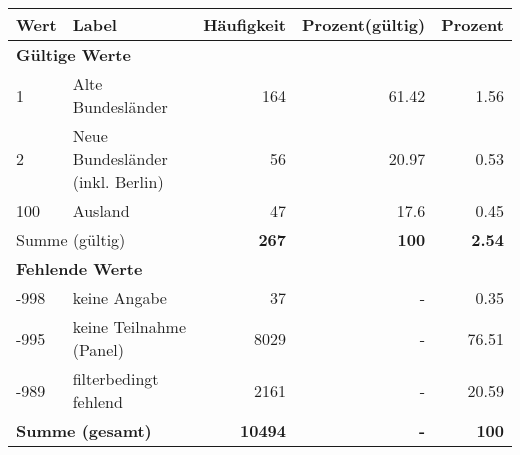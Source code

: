      \begin{longtable}{lXrrr}
     \toprule
     \textbf{Wert} & \textbf{Label} & \textbf{Häufigkeit} & \textbf{Prozent(gültig)} & \textbf{Prozent} \\
     \endhead
     \midrule
     \multicolumn{5}{l}{\textbf{Gültige Werte}}\\

     1 &
     \multicolumn{1}{X}{ Alte Bundesländer   } &


       \num{164} &
       \num[round-mode=places,round-precision=2]{61.42} &
         \num[round-mode=places,round-precision=2]{1.56} \\

     2 &
     \multicolumn{1}{X}{ Neue Bundesländer (inkl. Berlin)   } &


       \num{56} &
       \num[round-mode=places,round-precision=2]{20.97} &
         \num[round-mode=places,round-precision=2]{0.53} \\

     100 &
     \multicolumn{1}{X}{ Ausland   } &


       \num{47} &
       \num[round-mode=places,round-precision=2]{17.6} &
         \num[round-mode=places,round-precision=2]{0.45} \\
     \midrule
     \multicolumn{2}{l}{Summe (gültig)} &
       \textbf{\num{267}} &
     \textbf{\num{100}} &
       \textbf{\num[round-mode=places,round-precision=2]{2.54}} \\
     \multicolumn{5}{l}{\textbf{Fehlende Werte}}\\
       -998 &
       keine Angabe &
         \num{37} &
        - &
         \num[round-mode=places,round-precision=2]{0.35} \\
       -995 &
       keine Teilnahme (Panel) &
         \num{8029} &
        - &
         \num[round-mode=places,round-precision=2]{76.51} \\
       -989 &
       filterbedingt fehlend &
         \num{2161} &
        - &
         \num[round-mode=places,round-precision=2]{20.59} \\
     \midrule
     \multicolumn{2}{l}{\textbf{Summe (gesamt)}} &
          \textbf{\num{10494}} &
        \textbf{-} &
        \textbf{\num{100}} \\
     \bottomrule
     \end{longtable}
     
